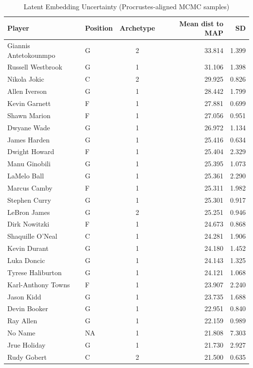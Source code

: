 \begin{table}[t]
\caption*{
{\fontsize{20}{25}\selectfont  Latent Embedding Uncertainty (Procrustes-aligned MCMC samples)\fontsize{12}{15}\selectfont }
} 
\fontsize{12.0pt}{14.0pt}\selectfont
\begin{tabular*}{\linewidth}{@{\extracolsep{\fill}}llcrr}
\toprule
Player & Position & Archetype & Mean dist to MAP & SD \\ 
\midrule\addlinespace[2.5pt]
Giannis Antetokounmpo & G & 2 & 33.814 & 1.399 \\ 
Russell Westbrook & G & 1 & 31.106 & 1.398 \\ 
Nikola Jokic & C & 2 & 29.925 & 0.826 \\ 
Allen Iverson & G & 1 & 28.442 & 1.799 \\ 
Kevin Garnett & F & 1 & 27.881 & 0.699 \\ 
Shawn Marion & F & 1 & 27.056 & 0.951 \\ 
Dwyane Wade & G & 1 & 26.972 & 1.134 \\ 
James Harden & G & 1 & 25.416 & 0.634 \\ 
Dwight Howard & F & 1 & 25.404 & 2.329 \\ 
Manu Ginobili & G & 1 & 25.395 & 1.073 \\ 
LaMelo Ball & G & 1 & 25.361 & 2.290 \\ 
Marcus Camby & F & 1 & 25.311 & 1.982 \\ 
Stephen Curry & G & 1 & 25.301 & 0.917 \\ 
LeBron James & G & 2 & 25.251 & 0.946 \\ 
Dirk Nowitzki & F & 1 & 24.673 & 0.868 \\ 
Shaquille O'Neal & C & 1 & 24.281 & 1.906 \\ 
Kevin Durant & G & 1 & 24.180 & 1.452 \\ 
Luka Doncic & G & 1 & 24.143 & 1.325 \\ 
Tyrese Haliburton & G & 1 & 24.121 & 1.068 \\ 
Karl-Anthony Towns & F & 1 & 23.907 & 2.240 \\ 
Jason Kidd & G & 1 & 23.735 & 1.688 \\ 
Devin Booker & G & 1 & 22.951 & 0.840 \\ 
Ray Allen & G & 1 & 22.159 & 0.989 \\ 
No Name & NA & 1 & 21.808 & 7.303 \\ 
Jrue Holiday & G & 1 & 21.730 & 2.927 \\ 
Rudy Gobert & C & 2 & 21.500 & 0.635 \\ 

\end{tabular*}
\end{table}

